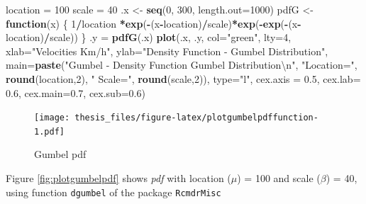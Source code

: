\documentclass[12pt,oneside]{reedthesis}
\newenvironment{Shaded}{\begin{snugshade}}{\end{snugshade}}
\newcommand{\CharTok}[1]{\textcolor[rgb]{0.31,0.60,0.02}{#1}}
\newcommand{\ControlFlowTok}[1]{\textcolor[rgb]{0.13,0.29,0.53}{\textbf{#1}}}
\newcommand{\DataTypeTok}[1]{\textcolor[rgb]{0.13,0.29,0.53}{#1}}
\newcommand{\DecValTok}[1]{\textcolor[rgb]{0.00,0.00,0.81}{#1}}
\newcommand{\FloatTok}[1]{\textcolor[rgb]{0.00,0.00,0.81}{#1}}
\newcommand{\KeywordTok}[1]{\textcolor[rgb]{0.13,0.29,0.53}{\textbf{#1}}}
\newcommand{\NormalTok}[1]{#1}
\newcommand{\OperatorTok}[1]{\textcolor[rgb]{0.81,0.36,0.00}{\textbf{#1}}}
\newcommand{\StringTok}[1]{\textcolor[rgb]{0.31,0.60,0.02}{#1}}
\begin{document}
\footnotesize
\begin{Shaded}
\begin{Highlighting}[]
\NormalTok{location =}\StringTok{ }\DecValTok{100}
\NormalTok{scale =}\StringTok{ }\DecValTok{40}
\NormalTok{.x <-}\StringTok{ }\KeywordTok{seq}\NormalTok{(}\DecValTok{0}\NormalTok{, }\DecValTok{300}\NormalTok{, }\DataTypeTok{length.out=}\DecValTok{1000}\NormalTok{)}
\NormalTok{pdfG <-}\StringTok{ }\ControlFlowTok{function}\NormalTok{(x) \{}
  \DecValTok{1}\OperatorTok{/}\NormalTok{location }\OperatorTok{*}\KeywordTok{exp}\NormalTok{(}\OperatorTok{-}\NormalTok{(x}\OperatorTok{-}\NormalTok{location)}\OperatorTok{/}\NormalTok{scale)}\OperatorTok{*}\KeywordTok{exp}\NormalTok{(}\OperatorTok{-}\KeywordTok{exp}\NormalTok{(}\OperatorTok{-}\NormalTok{(x}\OperatorTok{-}\NormalTok{location)}\OperatorTok{/}\NormalTok{scale))}
\NormalTok{  \}}
\NormalTok{.y =}\StringTok{ }\KeywordTok{pdfG}\NormalTok{(.x)}
\KeywordTok{plot}\NormalTok{(.x, .y, }\DataTypeTok{col=}\StringTok{"green"}\NormalTok{, }\DataTypeTok{lty=}\DecValTok{4}\NormalTok{, }
     \DataTypeTok{xlab=}\StringTok{"Velocities Km/h"}\NormalTok{, }\DataTypeTok{ylab=}\StringTok{"Density Function - Gumbel Distribution"}\NormalTok{, }
     \DataTypeTok{main=}\KeywordTok{paste}\NormalTok{(}\StringTok{"Gumbel - Density Function Gumbel Distribution}\CharTok{\textbackslash{}n}\StringTok{"}\NormalTok{, }\StringTok{"Location="}\NormalTok{, }
     \KeywordTok{round}\NormalTok{(location,}\DecValTok{2}\NormalTok{), }\StringTok{" Scale="}\NormalTok{, }\KeywordTok{round}\NormalTok{(scale,}\DecValTok{2}\NormalTok{)), }\DataTypeTok{type=}\StringTok{"l"}\NormalTok{, }
     \DataTypeTok{cex.axis =} \FloatTok{0.5}\NormalTok{, }\DataTypeTok{cex.lab=} \FloatTok{0.6}\NormalTok{, }\DataTypeTok{cex.main=}\FloatTok{0.7}\NormalTok{, }\DataTypeTok{cex.sub=}\FloatTok{0.6}\NormalTok{)}
\end{Highlighting}
\end{Shaded}
\begin{figure}
\centering
\texttt{[image: thesis\_files/figure-latex/plotgumbelpdffunction-1.pdf]}
\caption{\label{fig:plotgumbelpdffunction}Gumbel pdf}
\end{figure}
\normalsize

Figure \ref{fig:plotgumbelpdf} shows \emph{pdf} with location (\(\mu\)) = 100 and scale (\(\beta\)) = 40, using function \texttt{dgumbel} of the package \texttt{RcmdrMisc}
\end{document}
